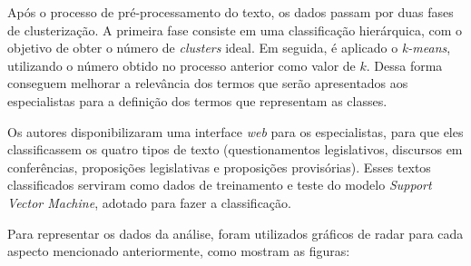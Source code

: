 Após o processo de pré-processamento do texto, os dados passam por duas fases de clusterização. A primeira fase consiste em uma classificação hierárquica, com o objetivo de obter o número de \textit{clusters} ideal. Em seguida, é aplicado o \textit{k-means}, utilizando o número obtido no processo anterior como valor de \(k\). Dessa forma conseguem melhorar a relevância dos termos que serão apresentados aos especialistas para a definição dos termos que representam as classes.

Os autores disponibilizaram uma interface \textit{web} para os especialistas, para que eles classificassem os quatro tipos de texto (questionamentos legislativos, discursos em conferências, proposições legislativas e proposições provisórias). Esses textos classificados serviram como dados de treinamento e teste do modelo \textit{Support Vector Machine}, adotado para fazer a classificação.

Para representar os dados da análise, foram utilizados gráficos de radar para cada aspecto mencionado anteriormente, como mostram as figuras:

